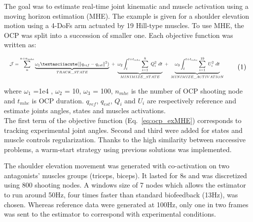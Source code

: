 The goal was to estimate real-time joint kinematic and muscle activation using a moving horizon estimation (MHE). The example is given for a shoulder elevation motion using a 4-DoFs arm actuated by 19 Hill-type muscles. To use MHE, the OCP was split into a succession of smaller one. Each objective function was written as:

\[
\resizebox{0.9\columnwidth}{!}{$
\begin{aligned} \noindent \mathcal{J} = \sum_{n}^{n + n_{mhe}}\underbrace{\omega_1´(\|q_{ref} - q_{est}\|^{2})}_{TRACK\_STATE} ~ + ~ \underbrace{\omega_2\int_t^{t+t_{mhe}} \sum_{i=1}^{8}~Q_{i}^2~dt}_{MINIMIZE\_ STATE} ~ + ~ \underbrace{\omega_3\int_t^{t+t_{mhe}} \sum_{i=1}^{19}~U_{i}^2~dt}_{MINIMIZE\_ ACTIVATION} 
\end{aligned}
$} \addtag \label{eq:ocp_exMHE} 
\]

\noindent where $\omega_1$ =1e4 , $\omega_2$ = 10, $\omega_3$ = 100, $n_{mhe}$ is the number of OCP shooting node and $t_{mhe}$ is OCP duration. $q_{ref}$, $q_{est}$, $Q_i$ and $U_i$ are respectively reference and estimate joints angles, states and muscles activations. \\  
The first term of the objective function (Eq.~\ref{eq:ocp_exMHE}) corresponds to tracking experimental joint angles. Second and third were added for states and muscle controls regularization. Thanks to the high similarity between successive problems, a warm-start strategy using previous solutions was implemented.  
 
 
The shoulder elevation movement was generated with co-activation on two antagonists' muscles groups (triceps, biceps). It lasted for 8s and was discretized using 800 shooting nodes. A windows size of 7 nodes which allows the estimator to run around 50Hz, four times faster than standard biofeedback (13Hz), was chosen. Whereas reference data were generated at 100Hz, only one in two frames was sent to the estimator to correspond with experimental conditions.
 
